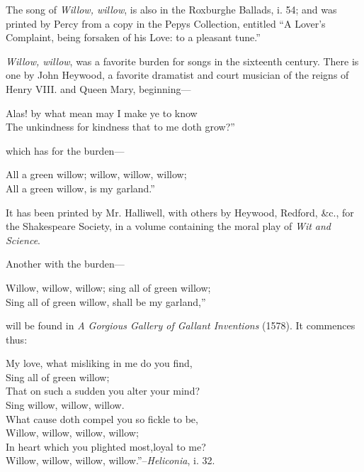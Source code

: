 The song of \textit{Willow, willow}, is also in the Roxburghe Ballads, i. 54; and was
printed by Percy from a copy in the Pepys Collection, entitled “A Lover’s
Complaint, being forsaken of his Love: to a pleasant tune.”

\textit{Willow, willow}, was a favorite burden for songs in the sixteenth century.
There is one by John Heywood, a favorite dramatist and court musician of the
reigns of Henry VIII. and Queen Mary, beginning—
\settowidth{\versewidth}{Alas! by what mean may I make ye to know}
\begin{scverse}
Alas! by what mean may I make ye to know\\
The unkindness for kindness that to me doth grow?”
\end{scverse}
which has for the burden—
\settowidth{\versewidth}{All a green willow; willow, willow, willow;}
\begin{scverse}
All a green willow; willow, willow, willow;\\
All a green willow, is my garland.”
\end{scverse}
It has been printed by Mr. Halliwell, with others by Heywood, Redford, \&c., for
the Shakespeare Society, in a volume containing the moral play of \textit{Wit and
Science}.

Another with the burden—
\begin{scverse}
Willow, willow, willow; sing all of green willow;\\
Sing all of green willow, shall be my garland,”
\end{scverse}
will be found in \textit{A Gorgious Gallery of Gallant Inventions} (1578). It commences
thus:
\settowidth{\versewidth}{My love, what misliking in me do you find,}
\begin{scverse}
\begin{patverse}
My love, what misliking in me do you find,\\
Sing all of green willow;\\
That on such a sudden you alter your mind?\\
Sing willow, willow, willow.\\
What cause doth compel you so fickle to be,\\
Willow, willow, willow, willow;\\
In heart which you plighted most,loyal to me?\\
Willow, willow, willow, willow.”--\textit{Heliconia}, i. 32.
\end{patverse}
\end{scverse}

